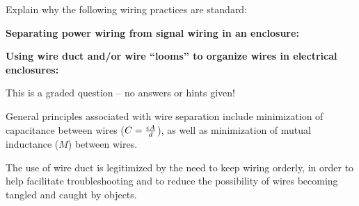

Explain why the following wiring practices are standard:

\vskip 10pt

{\bf Separating power wiring from signal wiring in an enclosure:}

\vskip 200pt

{\bf Using wire duct and/or wire ``looms'' to organize wires in electrical enclosures:}

\vskip 200pt

\vfil

\eject






This is a graded question -- no answers or hints given!







General principles associated with wire separation include minimization of capacitance between wires ($C = {\epsilon A \over d}$), as well as minimization of mutual inductance ($M$) between wires.

\vskip 10pt

The use of wire duct is legitimized by the need to keep wiring orderly, in order to help facilitate troubleshooting and to reduce the possibility of wires becoming tangled and caught by objects.




